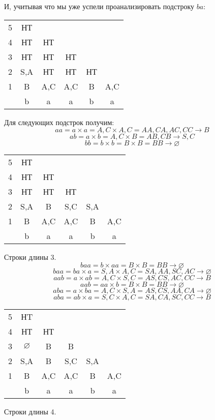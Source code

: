 \documentclass{article}
\begin{document}
И, учитывая что мы уже успели проанализировать подстроку $ba$:
\begin{center}
    \begin{tabular}{ c|c c c c c }
    5 & НТ  \\ 
    4 & НТ & НТ   \\  
    3 & НТ & НТ & НТ   \\  
    2 & S,A & НТ & НТ & НТ  \\  
    1 & B & A,C & A,C & B & A,C  \\
    \hline
      & b  &  a &  a & b  &  a 
    \end{tabular}
\end{center}
Для следующих подстрок получим:
$$aa = a\times a = A,C \times A,C = AA, CA, AC, CC \rightarrow B$$
$$ab = a\times b = A,C \times B = AB, CB \rightarrow S, C$$
$$bb = b\times b = B \times B = BB \rightarrow \varnothing$$
\begin{center}
    \begin{tabular}{ c|c c c c c }
    5 & НТ \\ 
    4 & НТ & НТ   \\  
    3 & НТ & НТ & НТ   \\  
    2 & S,A & B & S,C & S,A  \\  
    1 & B & A,C & A,C & B & A,C  \\
    \hline
      & b  &  a &  a & b  &  a 
    \end{tabular}
\end{center}
Строки длины 3.
$$baa = b\times aa = B \times B = BB \rightarrow \varnothing$$
$$baa = ba\times a = S,A \times A,C = SA, AA, SC, AC \rightarrow \varnothing$$
$$aab = a\times ab = A,C \times S,C = AS, CS, AC, CC \rightarrow B$$
$$aab = aa\times b = B \times B = BB \rightarrow \varnothing$$
$$aba = a\times ba = A,C \times S,A = AS, CS, AA, CA \rightarrow \varnothing$$
$$aba = ab\times a = S,C \times A,C = SA, CA, SC, CC \rightarrow B$$
\begin{center}
    \begin{tabular}{ c|c c c c c }
    5 & НT \\ 
    4 & НТ & НТ   \\  
    3 & $\varnothing$ & B & B   \\  
    2 & S,A & B & S,C & S,A  \\  
    1 & B & A,C & A,C & B & A,C  \\
    \hline
      & b  &  a &  a & b  &  a 
    \end{tabular}
\end{center}
Строки длины 4.
\end{document}
